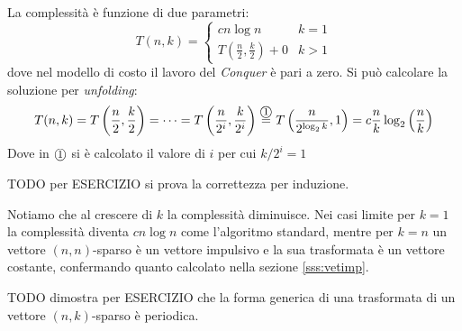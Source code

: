 La complessità è funzione di due parametri:
\begin{equation*}
    T(n,k) = 
    \begin{cases}
        c n \log n & k=1 \\
        T \left( \frac{n}{2}, \frac{k}{2} \right) + 0 & k>1
    \end{cases}
\end{equation*}
dove nel modello di costo il lavoro del \emph{Conquer} è pari a zero.
Si può calcolare la soluzione per \emph{unfolding}:
\begin{equation*}
    T(n,k) = T \left( \frac{n}{2}, \frac{k}{2} \right)
    = \cdots
    =  T \left( \frac{n}{2^{i}}, \frac{k}{2^{i}} \right)
    \overset{\mbox{\textcircled{\footnotesize 1}}}{=}
    T \left( \frac{n}{2^{\log_2 k}}, 1 \right)
    = c \frac{n}{k} \log_2 \left( \frac{n}{k} \right)
\end{equation*}
Dove in $\mbox{\textcircled{\footnotesize 1}}$ si è calcolato il valore di $i$ per cui $k/2^i=1$

TODO per ESERCIZIO si prova la correttezza per induzione.

Notiamo che al crescere di $k$ la complessità diminuisce. Nei casi limite per $k=1$ la complessità diventa $c n \log n$ come l'algoritmo standard, mentre per $k=n$ un vettore $(n,n)$-sparso è un vettore impulsivo e la sua trasformata è un vettore costante, confermando quanto calcolato nella sezione \ref{sss:vetimp}.

TODO dimostra per ESERCIZIO che la forma generica di una trasformata di un vettore $(n,k)$-sparso è periodica.
